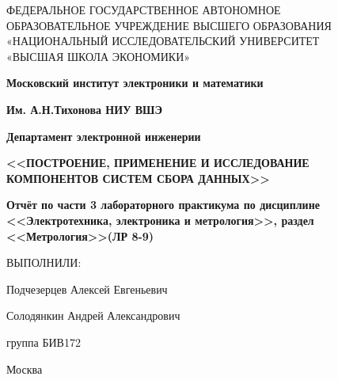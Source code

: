 \begin{titlepage}
	\begin{center}
		ФЕДЕРАЛЬНОЕ  ГОСУДАРСТВЕННОЕ АВТОНОМНОЕ \\
		ОБРАЗОВАТЕЛЬНОЕ УЧРЕЖДЕНИЕ ВЫСШЕГО ОБРАЗОВАНИЯ\\
		«НАЦИОНАЛЬНЫЙ ИССЛЕДОВАТЕЛЬСКИЙ УНИВЕРСИТЕТ\\
		«ВЫСШАЯ ШКОЛА ЭКОНОМИКИ»
	\end{center}
	
	\begin{center}
		\textbf{Московский институт электроники и математики}
		
		\textbf{Им. А.Н.Тихонова НИУ ВШЭ}
		
		\textbf{Департамент электронной инженерии}
	\end{center}	
	\vspace{5ex}
	\begin{center}
\textbf{<<ПОСТРОЕНИЕ, ПРИМЕНЕНИЕ И ИССЛЕДОВАНИЕ КОМПОНЕНТОВ СИСТЕМ СБОРА ДАННЫХ>>}
	\end{center}	
	\vspace{1ex}
	\begin{center}
\textbf{Отчёт по части 3 лабораторного практикума по дисциплине \\
	<<Электротехника, электроника и метрология>>, раздел <<Метрология>>(ЛР 8-9)}
	\end{center}	
	\vspace{5ex}
	
	\begin{multicols}{2}
	\vfill\null
	\columnbreak
	ВЫПОЛНИЛИ:
	
	Подчезерцев Алексей Евгеньевич
	
	Солодянкин Андрей Александрович
	
	группа БИВ172
	\end{multicols}

	\vfill
	\begin{center}
		Москва \the\year
	\end{center}
\end{titlepage}